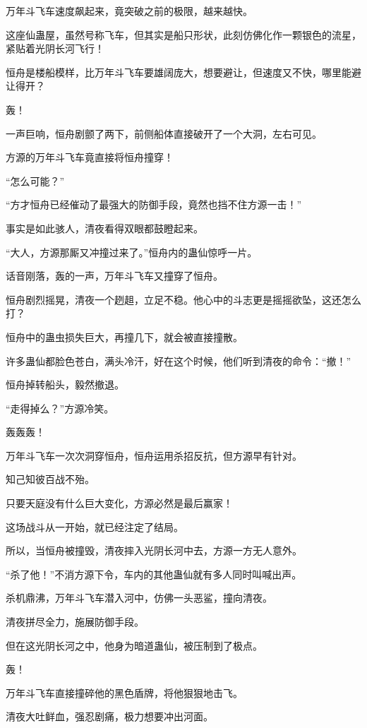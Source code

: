 \begin{this_body}
万年斗飞车速度飙起来，竟突破之前的极限，越来越快。

这座仙蛊屋，虽然号称飞车，但其实是船只形状，此刻仿佛化作一颗银色的流星，紧贴着光阴长河飞行！

恒舟是楼船模样，比万年斗飞车要雄阔庞大，想要避让，但速度又不快，哪里能避让得开？

轰！

一声巨响，恒舟剧颤了两下，前侧船体直接破开了一个大洞，左右可见。

方源的万年斗飞车竟直接将恒舟撞穿！

“怎么可能？”

“方才恒舟已经催动了最强大的防御手段，竟然也挡不住方源一击！”

事实是如此骇人，清夜看得双眼都鼓瞪起来。

“大人，方源那厮又冲撞过来了。”恒舟内的蛊仙惊呼一片。

话音刚落，轰的一声，万年斗飞车又撞穿了恒舟。

恒舟剧烈摇晃，清夜一个趔趄，立足不稳。他心中的斗志更是摇摇欲坠，这还怎么打？

恒舟中的蛊虫损失巨大，再撞几下，就会被直接撞散。

许多蛊仙都脸色苍白，满头冷汗，好在这个时候，他们听到清夜的命令：“撤！”

恒舟掉转船头，毅然撤退。

“走得掉么？”方源冷笑。

轰轰轰！

万年斗飞车一次次洞穿恒舟，恒舟运用杀招反抗，但方源早有针对。

知己知彼百战不殆。

只要天庭没有什么巨大变化，方源必然是最后赢家！

这场战斗从一开始，就已经注定了结局。

所以，当恒舟被撞毁，清夜摔入光阴长河中去，方源一方无人意外。

“杀了他！”不消方源下令，车内的其他蛊仙就有多人同时叫喊出声。

杀机鼎沸，万年斗飞车潜入河中，仿佛一头恶鲨，撞向清夜。

清夜拼尽全力，施展防御手段。

但在这光阴长河之中，他身为暗道蛊仙，被压制到了极点。

轰！

万年斗飞车直接撞碎他的黑色盾牌，将他狠狠地击飞。

清夜大吐鲜血，强忍剧痛，极力想要冲出河面。


\end{this_body}
